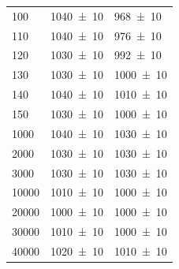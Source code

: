 \begin{center}
\begin{adjustbox}{max width=\linewidth, keepaspectratio}
\begin{tabular}{lll}
            \SI{100}{}                   & \SI{1040 \pm 10}{}                                       & \SI{968 \pm 10}{}                                        \\
            \SI{110}{}                   & \SI{1040 \pm 10}{}                                       & \SI{976 \pm 10}{}                                        \\
            \SI{120}{}                   & \SI{1030 \pm 10}{}                                       & \SI{992 \pm 10}{}                                        \\
            \SI{130}{}                   & \SI{1030 \pm 10}{}                                       & \SI{1000 \pm 10}{}                                       \\
            \SI{140}{}                   & \SI{1040 \pm 10}{}                                       & \SI{1010 \pm 10}{}                                       \\
            \SI{150}{}                   & \SI{1030 \pm 10}{}                                       & \SI{1000 \pm 10}{}                                       \\
            \SI{1000}{}                  & \SI{1040 \pm 10}{}                                       & \SI{1030 \pm 10}{}                                       \\
            \SI{2000}{}                  & \SI{1030 \pm 10}{}                                       & \SI{1030 \pm 10}{}                                       \\
            \SI{3000}{}                  & \SI{1030 \pm 10}{}                                       & \SI{1030 \pm 10}{}                                       \\
            \SI{10000}{}                 & \SI{1010 \pm 10}{}                                       & \SI{1000 \pm 10}{}                                       \\
            \SI{20000}{}                 & \SI{1000 \pm 10}{}                                       & \SI{1000 \pm 10}{}                                       \\
            \SI{30000}{}                 & \SI{1010 \pm 10}{}                                       & \SI{1000 \pm 10}{}                                       \\
            \SI{40000}{}                 & \SI{1020 \pm 10}{}                                       & \SI{1010 \pm 10}{}                                       \\

\end{tabular}
\end{adjustbox}
\end{center}
